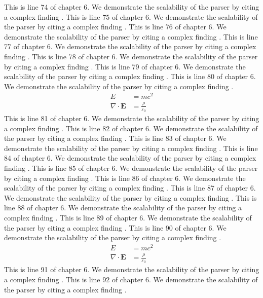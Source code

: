 This is line 74 of chapter 6. We demonstrate the scalability of the parser by citing a complex finding \cite{ref6_74}.
This is line 75 of chapter 6. We demonstrate the scalability of the parser by citing a complex finding \cite{ref6_75}.
This is line 76 of chapter 6. We demonstrate the scalability of the parser by citing a complex finding \cite{ref6_76}.
This is line 77 of chapter 6. We demonstrate the scalability of the parser by citing a complex finding \cite{ref6_77}.
This is line 78 of chapter 6. We demonstrate the scalability of the parser by citing a complex finding \cite{ref6_78}.
This is line 79 of chapter 6. We demonstrate the scalability of the parser by citing a complex finding \cite{ref6_79}.
This is line 80 of chapter 6. We demonstrate the scalability of the parser by citing a complex finding \cite{ref6_80}.
\begin{align*}
  E &= mc^2 \\
  \nabla \cdot \mathbf{E} &= \frac{\rho}{\varepsilon_0}
\end{align*}
This is line 81 of chapter 6. We demonstrate the scalability of the parser by citing a complex finding \cite{ref6_81}.
This is line 82 of chapter 6. We demonstrate the scalability of the parser by citing a complex finding \cite{ref6_82}.
This is line 83 of chapter 6. We demonstrate the scalability of the parser by citing a complex finding \cite{ref6_83}.
This is line 84 of chapter 6. We demonstrate the scalability of the parser by citing a complex finding \cite{ref6_84}.
This is line 85 of chapter 6. We demonstrate the scalability of the parser by citing a complex finding \cite{ref6_85}.
This is line 86 of chapter 6. We demonstrate the scalability of the parser by citing a complex finding \cite{ref6_86}.
This is line 87 of chapter 6. We demonstrate the scalability of the parser by citing a complex finding \cite{ref6_87}.
This is line 88 of chapter 6. We demonstrate the scalability of the parser by citing a complex finding \cite{ref6_88}.
This is line 89 of chapter 6. We demonstrate the scalability of the parser by citing a complex finding \cite{ref6_89}.
This is line 90 of chapter 6. We demonstrate the scalability of the parser by citing a complex finding \cite{ref6_90}.
\begin{align*}
  E &= mc^2 \\
  \nabla \cdot \mathbf{E} &= \frac{\rho}{\varepsilon_0}
\end{align*}
This is line 91 of chapter 6. We demonstrate the scalability of the parser by citing a complex finding \cite{ref6_91}.
This is line 92 of chapter 6. We demonstrate the scalability of the parser by citing a complex finding \cite{ref6_92}.
